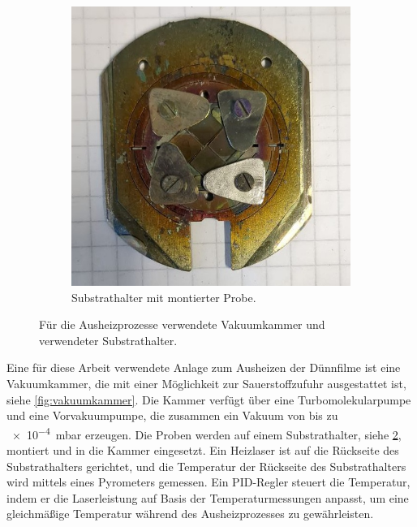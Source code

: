 \begin{figure}
\begin{subfigure}{0.35\textwidth}
        \includegraphics[width=\textwidth]{../assets/messmethoden/heiz/sample_holder}
        \caption{Substrathalter mit montierter Probe.}
        \label{fig:sample_holder}
    \end{subfigure}
    \caption{Für die Ausheizprozesse verwendete Vakuumkammer und verwendeter Substrathalter.}
\end{figure}
Eine für diese Arbeit verwendete Anlage zum Ausheizen der Dünnfilme ist eine Vakuumkammer, die mit einer Möglichkeit
zur Sauerstoffzufuhr ausgestattet ist, siehe \cref{fig:vakuumkammer}.
Die Kammer verfügt über eine Turbomolekularpumpe und eine Vorvakuumpumpe, die zusammen ein Vakuum von bis zu
\qty{e-4}{\milli\bar} erzeugen.
Die Proben werden auf einem Substrathalter, siehe \cref{fig:sample_holder}, montiert und in die Kammer eingesetzt.
Ein Heizlaser ist auf die Rückseite des Substrathalters gerichtet, und die Temperatur der Rückseite des Substrathalters
wird mittels eines Pyrometers gemessen.
Ein PID-Regler steuert die Temperatur, indem er die Laserleistung auf Basis der Temperaturmessungen anpasst, um eine
gleichmäßige Temperatur während des Ausheizprozesses zu gewährleisten.

